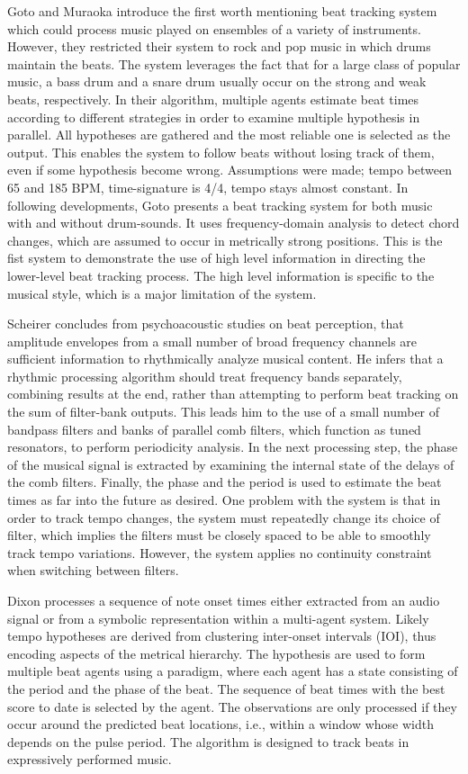 \documentclass{scrartcl}
\begin{document}
Goto and Muraoka \cite{Goto1994} introduce the first worth mentioning beat tracking system which could process music played on ensembles of a variety of instruments. However, they restricted their system to rock and pop music in which drums maintain the beats. The system leverages the fact that for a large class of popular music, a bass drum and a snare drum usually occur on the strong and weak beats, respectively. In their algorithm, multiple agents estimate beat times according to different strategies in order to examine multiple hypothesis in parallel. All hypotheses are gathered and the most reliable one is selected as the output. This enables the system to follow beats without losing track of them, even if some hypothesis become wrong. Assumptions were made; tempo between 65 and 185 BPM, time-signature is 4/4, tempo stays almost constant. In following developments, Goto \cite{Goto2001} presents a beat tracking system for both music with and without drum-sounds. It uses frequency-domain analysis to detect chord changes, which are assumed to occur in metrically strong positions. This is the fist system to demonstrate the use of high level information in directing the lower-level beat tracking process. The high level information is specific to the musical style, which is a major limitation of the system.  

Scheirer \cite{Scheirer1998} concludes from psychoacoustic studies on beat perception, that amplitude envelopes from a small number of broad frequency channels are sufficient information to rhythmically analyze musical content. He infers that a rhythmic processing algorithm should treat frequency bands separately, combining results at the end, rather than attempting to perform beat tracking on the sum of filter-bank outputs. This leads him to the use of a small number of bandpass filters and banks of parallel comb filters, which function as tuned resonators, to perform periodicity analysis. In the next processing step, the phase of the musical signal is extracted by examining the internal state of the delays of the comb filters. Finally, the phase and the period is used to estimate the beat times as far into the future as desired. One problem with the system is that in order to track tempo changes, the system must repeatedly change its choice of filter, which implies the filters must be closely spaced to be able to smoothly track tempo variations. However, the system applies no continuity constraint when switching between filters.  

Dixon \cite{Dixon2001} processes a sequence of note onset times either extracted from an audio signal or from a symbolic representation within a multi-agent system. Likely tempo hypotheses are derived from clustering inter-onset intervals (IOI), thus encoding aspects of the metrical hierarchy. The hypothesis are used to form multiple beat agents using a paradigm, where each agent has a state consisting of the period and the phase of the beat. The sequence of beat times with the best score to date is selected by the agent. The observations are only processed if they occur around the predicted beat locations, i.e., within a window whose width depends on the pulse period. The algorithm is designed to track beats in expressively performed music.
\end{document}
